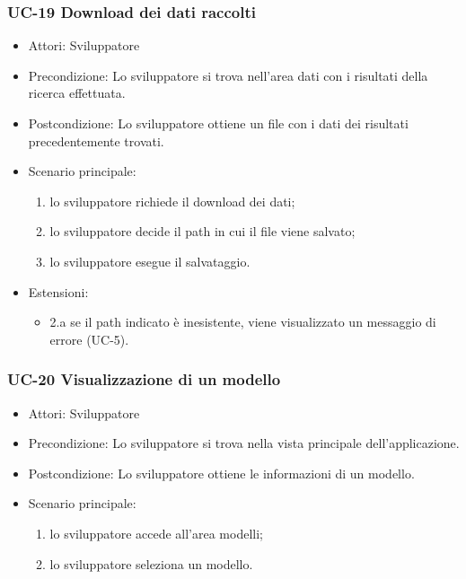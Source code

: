 	\subsubsection{UC-19 Download dei dati raccolti}
		\begin{itemize}
			\item Attori: Sviluppatore
			\item Precondizione: Lo sviluppatore si trova nell'area dati con i risultati della ricerca effettuata.
			\item Postcondizione: Lo sviluppatore ottiene un file con i dati dei risultati precedentemente trovati.
			\item Scenario principale:
				\begin{enumerate}
					\item lo sviluppatore richiede il download dei dati;
					\item lo sviluppatore decide il path in cui il file viene salvato;
					\item lo sviluppatore esegue il salvataggio.
				\end{enumerate}
			\item Estensioni:
				\begin{itemize}
					\item 2.a se il path indicato è inesistente, viene visualizzato un messaggio di errore (UC-5).
				\end{itemize}
		\end{itemize} 


		
	\subsubsection{UC-20 Visualizzazione di un modello}
		\begin{itemize}
			\item Attori: Sviluppatore
			\item Precondizione: Lo sviluppatore si trova nella vista principale dell'applicazione.
			\item Postcondizione: Lo sviluppatore ottiene le informazioni di un modello.
			\item Scenario principale:
			\begin{enumerate}
				\item lo sviluppatore accede all'area modelli;
				\item lo sviluppatore seleziona un modello.
			\end{enumerate}
	\end{itemize}
	
